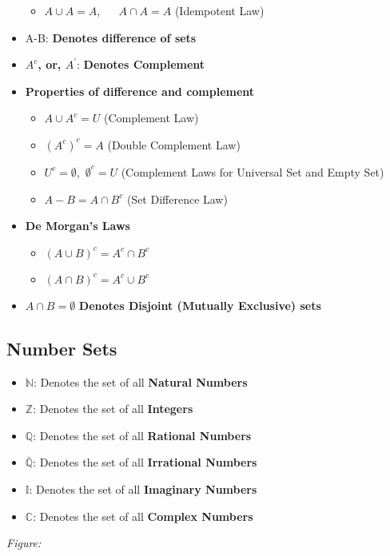 \documentclass{report}
\begin{document}
\begin{itemize}
\begin{itemize}
          \item $A \cup A = A  $, $\quad$ $A \cap A = A  $ (Idempotent Law)
        \end{itemize}
        \item A-B: \textbf{Denotes difference of sets}
        \item \textbf{$A^{c}$, or, $A^{\prime}$}: \textbf{Denotes Complement}
        \item \textbf{Properties of difference and complement}
          \begin{itemize}
            \item $A \cup A^{c} = U$ (Complement Law)
            \item $(A^{c})^{c} = A$ (Double Complement Law)
            \item $U^{c}  = \emptyset$,\ $\emptyset^{c} = U $ (Complement Laws for Universal Set and Empty Set)
            \item $A-B  = A \cap B^{c}$ (Set Difference Law)
          \end{itemize}
        \item \textbf{De Morgan's Laws}
          \begin{itemize}
            \item $(A \cup B)^{c} = A^{c} \cap B^{c}$
            \item $(A \cap B)^{c} = A^{c} \cup B^{c}$
          \end{itemize}
        \item $A \cap B  = \emptyset$ \textbf{Denotes Disjoint (Mutually Exclusive) sets}
      \end{itemize}
      \pagebreak \bigbreak \noindent 

        \bigbreak \noindent \bigbreak \noindent 
        \subsection{Number Sets}
        \bigbreak \noindent 
            \begin{itemize}
        \item $\mathbb{N}$: Denotes the set of all \textbf{Natural Numbers}
        \item $\mathbb{Z}$: Denotes the set of all \textbf{Integers}
        \item $\mathbb{Q}$: Denotes the set of all \textbf{Rational Numbers}
        \item $\mathbb{\bar{Q}}$: Denotes the set of all \textbf{Irrational Numbers}
        \item $\mathbb{I}$: Denotes the set of all \textbf{Imaginary Numbers}
        \item $\mathbb{C}$: Denotes the set of all \textbf{Complex Numbers}
    \end{itemize}
    \bigbreak \noindent 
    \textit{Figure:}
  \begin{figure}[ht]
      \centering
      \label{fig:fig12}
  \end{figure}
  \bigbreak \noindent \bigbreak \noindent 
\end{document}
